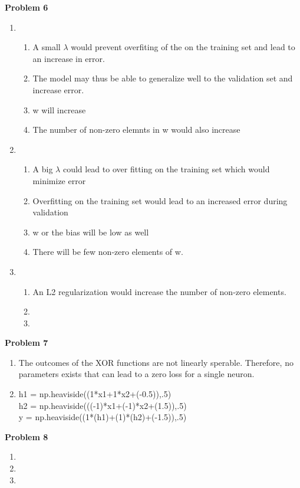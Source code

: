 \documentclass[11pt,letterpaper]{article}
\begin{document}
\textbf{Problem 6}
\begin{enumerate}[labelindent=0pt]
\item
	\begin{enumerate}[labelindent=0pt]
	\item
	A small $\lambda$ would prevent overfiting of the on the training set
and lead to an increase in error.
	\item
	The model may thus be able to generalize well to the validation set and
increase error.
	\item
	w will increase
	\item
	The number of non-zero elemnts in w would also increase
	\end{enumerate}
\item
	\begin{enumerate}[labelindent=0pt]
	\item
	A big $\lambda$ could lead to over fitting on the training set which
would minimize error
	\item 
	Overfitting on the training set would lead to an increased error during
validation
	\item
	w or the bias will be low as well
	\item
	There will be few non-zero elements of w.
	\end{enumerate}
\item
	\begin{enumerate}[labelindent=0pt]
	\item
	An L2 regularization would increase the number of non-zero elements.	
	\item
	\item
	\end{enumerate}
\end{enumerate}
\textbf{Problem 7}
\begin{enumerate}[labelindent=0pt]
\item 
The outcomes of the XOR functions are not linearly sperable.  Therefore, no
parameters exists that can lead to a zero loss for a single neuron.
\item
h1 = np.heaviside((1*x1+1*x2+(-0.5)),.5)\\
h2 = np.heaviside(((-1)*x1+(-1)*x2+(1.5)),.5)\\
y = np.heaviside((1*(h1)+(1)*(h2)+(-1.5)),.5)

\end{enumerate}

\textbf{Problem 8}
\begin{enumerate}[labelindent=0pt]
\item 
\item
\item
\end{enumerate}

\noindent
\end{document}

